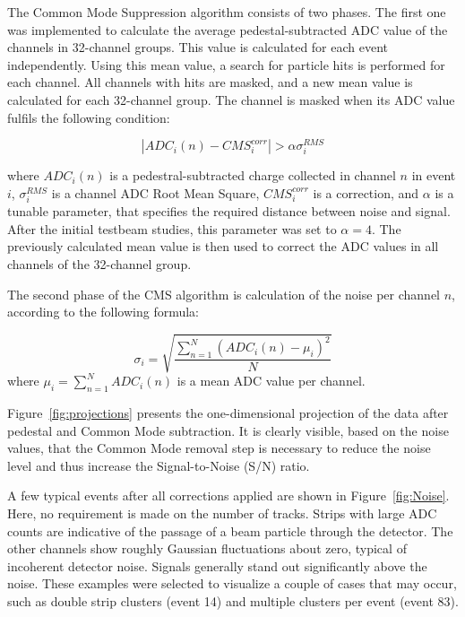 The Common Mode Suppression algorithm consists of two phases. The first one was implemented to calculate the average pedestal-subtracted ADC value of the channels in 32-channel groups. This value is calculated for each event independently. Using this mean value, a search for particle hits is performed for each channel. All channels with hits are masked, and a new mean value is calculated for each 32-channel group. The channel is masked when its ADC value fulfils the following condition:

\begin{equation}
    |ADC_{i}(n)-CMS^{corr}_{i}| > \alpha \sigma^{RMS}_{i}
\end{equation}

where $ADC_{i}(n)$ is a pedestral-subtracted charge collected in channel $n$ in event $i$, $\sigma^{RMS}_{i}$ is a channel ADC Root Mean Square, $CMS^{corr}_{i} $ is a correction, and $\alpha$ is a tunable parameter, that specifies the required distance between noise and signal. After the initial testbeam studies, this parameter was set to $\alpha = 4$. 
The previously calculated mean value is then used to correct the ADC values in all channels of the 32-channel group.

The second phase of the CMS algorithm is calculation of the noise per channel $n$, according to the following formula: 

\begin{equation}
    \sigma_i  = \sqrt{\frac{\sum_{n=1}^{N} (ADC_{i}(n)-\mu_{i})^2}{N}}
\end{equation}
where $\mu_{i} = \sum_{n=1}^{N} ADC_{i}(n)$ is a mean ADC value per channel. 


Figure~\ref{fig:projections} presents the one-dimensional projection of the data after pedestal and Common Mode subtraction. It is clearly visible, based on the noise values, that the Common Mode removal step is necessary to reduce the noise level and thus increase the Signal-to-Noise (S/N) ratio. 

A few typical events after all corrections applied are shown in Figure~\ref{fig:Noise}. Here, no requirement is made on the number of tracks. Strips with large ADC counts are indicative of the passage of a beam particle through the detector. The other channels show roughly Gaussian fluctuations about zero, typical of incoherent detector noise. Signals generally
stand out significantly above the noise. These examples were selected to visualize a couple of cases that may occur, such as double strip clusters (event 14) and multiple clusters per event (event 83).  


